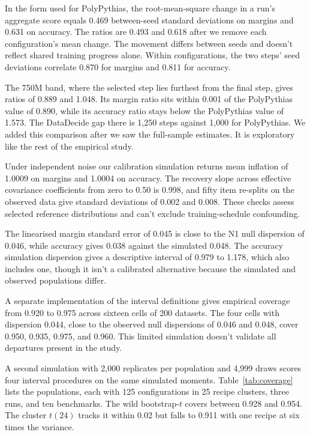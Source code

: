 In the form used for PolyPythias, the root-mean-square change in a run's aggregate score equals 0.469 between-seed standard deviations on margins and 0.631 on accuracy. The ratios are 0.493 and 0.618 after we remove each configuration's mean change. The movement differs between seeds and doesn't reflect shared training progress alone. Within configurations, the two steps' seed deviations correlate 0.870 for margins and 0.811 for accuracy.

The 750M band, where the selected step lies furthest from the final step, gives ratios of 0.889 and 1.048. Its margin ratio sits within 0.001 of the PolyPythias value of 0.890, while its accuracy ratio stays below the PolyPythias value of 1.573. The DataDecide gap there is 1,250 steps against 1,000 for PolyPythias. We added this comparison after we saw the full-sample estimates. It is exploratory like the rest of the empirical study.

\label{app:calibration}
Under independent noise our calibration simulation returns mean inflation of 1.0009 on margins and 1.0004 on accuracy. The recovery slope across effective covariance coefficients from zero to 0.50 is 0.998, and fifty item re-splits on the observed data give standard deviations of 0.002 and 0.008. These checks assess selected reference distributions and can't exclude training-schedule confounding.

The linearised margin standard error of 0.045 is close to the N1 null dispersion of 0.046, while accuracy gives 0.038 against the simulated 0.048. The accuracy simulation dispersion gives a descriptive interval of 0.979 to 1.178, which also includes one, though it isn't a calibrated alternative because the simulated and observed populations differ.

A separate implementation of the interval definitions gives empirical coverage from 0.920 to 0.975 across sixteen cells of 200 datasets. The four cells with dispersion 0.044, close to the observed null dispersions of 0.046 and 0.048, cover 0.950, 0.935, 0.975, and 0.960. This limited simulation doesn't validate all departures present in the study.

A second simulation with 2,000 replicates per population and 4,999 draws scores four interval procedures on the same simulated moments. Table~\ref{tab:coverage} lists the populations, each with 125 configurations in 25 recipe clusters, three runs, and ten benchmarks. The wild bootstrap-$t$ covers between 0.928 and 0.954. The cluster $t(24)$ tracks it within 0.02 but falls to 0.911 with one recipe at six times the variance.

